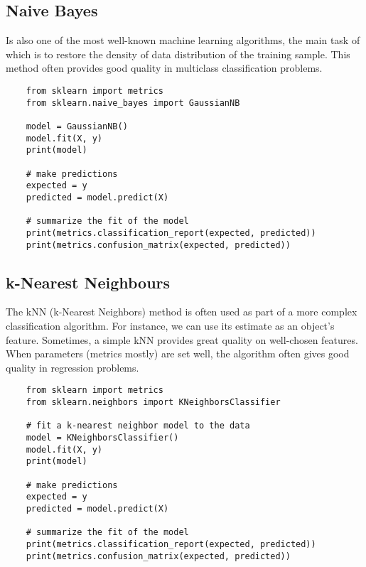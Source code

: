 \documentclass[a4paper,12pt]{article}
\begin{document}
\subsection{Naive Bayes}
Is also one of the most well-known machine learning algorithms, the main task of which is to restore the density of data distribution of the training sample. This method often provides good quality in multiclass classification problems.

\begin{framed}
	\begin{verbatim}
	from sklearn import metrics
	from sklearn.naive_bayes import GaussianNB
	
	model = GaussianNB()
	model.fit(X, y)
	print(model)
	
	# make predictions
	expected = y
	predicted = model.predict(X)
	
	# summarize the fit of the model
	print(metrics.classification_report(expected, predicted))
	print(metrics.confusion_matrix(expected, predicted))
	\end{verbatim}
\end{framed}
\newpage
\subsection{k-Nearest Neighbours}
The kNN (k-Nearest Neighbors) method is often used as part of a more complex classification algorithm. For instance, we can use its estimate as an object’s feature. Sometimes, a simple kNN provides great quality on well-chosen features. When parameters (metrics mostly) are set well, the algorithm often gives good quality in regression problems.

\begin{framed}
	\begin{verbatim}
	from sklearn import metrics
	from sklearn.neighbors import KNeighborsClassifier
	
	# fit a k-nearest neighbor model to the data
	model = KNeighborsClassifier()
	model.fit(X, y)
	print(model)
	
	# make predictions
	expected = y
	predicted = model.predict(X)
	
	# summarize the fit of the model
	print(metrics.classification_report(expected, predicted))
	print(metrics.confusion_matrix(expected, predicted))
	\end{verbatim}
\end{framed}
\newpage
\end{document}
